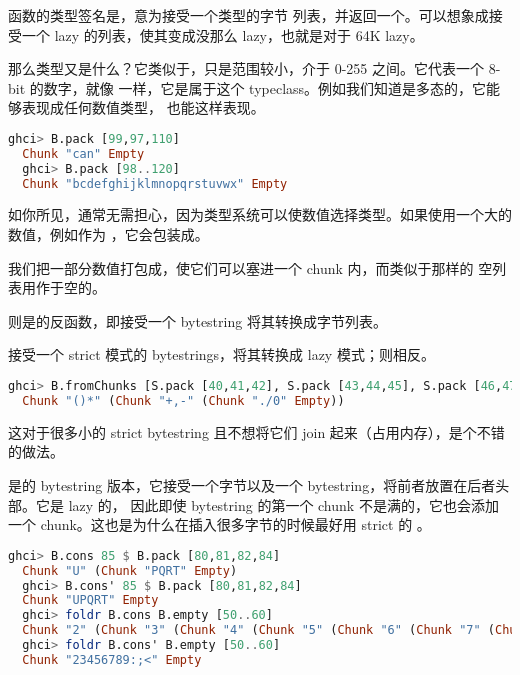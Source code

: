 \documentclass[./main.tex]{subfiles}
\begin{document}
函数的类型签名是，意为接受一个类型的字节
列表，并返回一个。可以想象成接受一个 lazy 的列表，使其变成没那么 lazy，也就是对于 64K lazy。

那么类型又是什么？它类似于，只是范围较小，介于 0-255 之间。它代表一个 8-bit 的数字，就像
一样，它是属于这个 typeclass。例如我们知道是多态的，它能够表现成任何数值类型，
也能这样表现。

\begin{lstlisting}[language=Haskell]
  ghci> B.pack [99,97,110]
  Chunk "can" Empty
  ghci> B.pack [98..120]
  Chunk "bcdefghijklmnopqrstuvwx" Empty
\end{lstlisting}

如你所见，通常无需担心，因为类型系统可以使数值选择类型。如果使用一个大的数值，例如作为
，它会包装成。

我们把一部分数值打包成，使它们可以塞进一个 chunk 内，而类似于\acode{[]}那样的
空列表用作于空的。

则是的反函数，即接受一个 bytestring 将其转换成字节列表。

接受一个 strict 模式的 bytestrings，将其转换成 lazy 模式；则相反。

\begin{lstlisting}[language=Haskell]
  ghci> B.fromChunks [S.pack [40,41,42], S.pack [43,44,45], S.pack [46,47,48]]
  Chunk "()*" (Chunk "+,-" (Chunk "./0" Empty))
\end{lstlisting}

这对于很多小的 strict bytestring 且不想将它们 join 起来（占用内存），是个不错的做法。

是\acode{:}的 bytestring 版本，它接受一个字节以及一个 bytestring，将前者放置在后者头部。它是 lazy 的，
因此即使 bytestring 的第一个 chunk 不是满的，它也会添加一个 chunk。这也是为什么在插入很多字节的时候最好用 strict 的
。

\begin{lstlisting}[language=Haskell]
  ghci> B.cons 85 $ B.pack [80,81,82,84]
  Chunk "U" (Chunk "PQRT" Empty)
  ghci> B.cons' 85 $ B.pack [80,81,82,84]
  Chunk "UPQRT" Empty
  ghci> foldr B.cons B.empty [50..60]
  Chunk "2" (Chunk "3" (Chunk "4" (Chunk "5" (Chunk "6" (Chunk "7" (Chunk "8" (Chunk "9" (Chunk ":" (Chunk ";" (Chunk "<" Empty))))))))))
  ghci> foldr B.cons' B.empty [50..60]
  Chunk "23456789:;<" Empty
\end{lstlisting}
\end{document}
